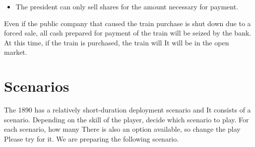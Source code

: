 \documentclass{article}
\begin{document}
\begin{CJK}{UTF8}{min}
\begin{itemize}
\item The president can only sell shares for the amount necessary for
  payment.
\end{itemize}

Even if the public company that caused the train purchase is shut down
due to a forced sale, all cash prepared for payment of the train will
be seized by the bank. At this time, if the train is purchased, the
train will It will be in the open market.













\section*{Scenarios}

The 1890 has a relatively short-duration deployment scenario and It
consists of a scenario. Depending on the skill of the player, decide
which scenario to play. For each scenario, how many There is also an
option available, so change the play Please try for it. We are
preparing the following scenario.


\end{CJK}
\end{document}
